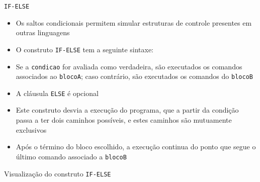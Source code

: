 \begin{frame}[fragile]{\tt IF-ELSE}

    \begin{itemize}
        \item Os saltos condicionais permitem simular estruturas de controle presentes em outras
            linguagens

        \item O construto \texttt{IF-ELSE} tem a seguinte sintaxe:


        \item Se a \texttt{condicao} for avaliada como verdadeira, são executados os comandos
            associados ao \texttt{blocoA}; caso contrário, são executados os comandos do
            \texttt{blocoB}

        \item A cláusula \texttt{ELSE} é opcional

        \item Este construto desvia a execução do programa, que a partir da condição passa a
            ter dois caminhos possíveis, e estes caminhos são mutuamente exclusivos

        \item Após o término do bloco escolhido, a execução continua do ponto que segue o último
            comando associado a \texttt{blocoB}
    \end{itemize}

\end{frame}

\begin{frame}[fragile]{Visualização do construto {\tt IF-ELSE}}
    \begin{figure}[ht]
        \centering
    \end{figure}
\end{frame}

